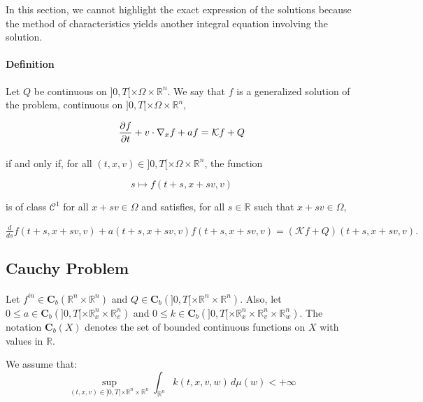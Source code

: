 \documentclass[a4paper, 11pt]{article}
\begin{document}
In this section, we cannot highlight the exact expression of the solutions because the method of characteristics yields another integral equation involving the solution.




\paragraph{Definition}

Let $Q$ be continuous on $]0,T[\times \Omega \times \mathbb{R}^n$. We say that $f$ is a generalized solution of the problem, continuous on $]0,T[\times \Omega \times \mathbb{R}^n$,


$$\frac{\partial f}{\partial t}+v \cdot \nabla_x f +af = \mathcal{K} f +Q\\$$

\paragraph{}
if and only if, for all $(t,x,v) \in ]0,T[\times \Omega \times \mathbb{R}^n$, the function 

\[ s \mapsto f(t+s,x+sv,v) \]

is of class $\mathcal{C}^1$ for all $x+sv \in \Omega$ and satisfies, for all $s \in \mathbb{R}$ such that $x +sv \in \Omega$,

$\frac{d}{ds}f(t+s,x+sv,v) +a(t+s,x+sv,v)f(t+s,x+sv,v) = (\mathcal{K}f+ Q)(t+s,x+sv,v).$

\subsection{Cauchy Problem}
\paragraph{}



Let $f^{in} \in \mathbf{C}_b(\mathbb{R}^n \times \mathbb{R}^n)$ and $Q \in \mathbf{C}_b(]0,T[ \times \mathbb{R}^n \times \mathbb{R}^n)$. Also, let $0 \leq a \in \mathbf{C}_b(]0,T[ \times \mathbb{R}_x^n \times \mathbb{R}_v^n)$ and $0 \leq k \in \mathbf{C}_b(]0,T[ \times \mathbb{R}_x^n \times \mathbb{R}_v^n \times \mathbb{R}_w^n)$. The notation $\mathbf{C}_b(X)$ denotes the set of bounded continuous functions on $X$ with values in $\mathbb{R}$.


We assume that:  \[ \underset{(t,x,v) \in ]0,T[ \times \mathbb{R}^n \times \mathbb{R}^n}{\sup} \int_{\mathbb{R}^n} k(t,x,v,w) \, d\mu(w) < +\infty \]
\end{document}
